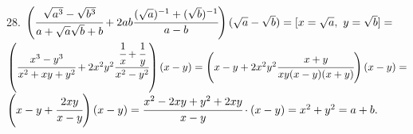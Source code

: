 28. $\left(\cfrac{\sqrt{a^3}-\sqrt{b^3}}{a+\sqrt{a}\sqrt{b}+b}+
2ab\cfrac{(\sqrt{a})^{-1}+(\sqrt{b})^{-1}}{a-b}\right)(\sqrt{a}-\sqrt{b})=[x=\sqrt{a},\ y=\sqrt{b}]=$\\$
\left(\cfrac{x^3-y^3}{x^2+xy+y^2}+2x^2y^2\cfrac{\cfrac{1}{x}+\cfrac{1}{y}}{x^2-y^2}\right)(x-y)=
\left(x-y+2x^2y^2\cfrac{x+y}{xy(x-y)(x+y)}\right)(x-y)=$\\$\left(x-y+\cfrac{2xy}{x-y}\right)(x-y)=
\cfrac{x^2-2xy+y^2+2xy}{x-y}\cdot(x-y)=x^2+y^2=a+b.$\\
